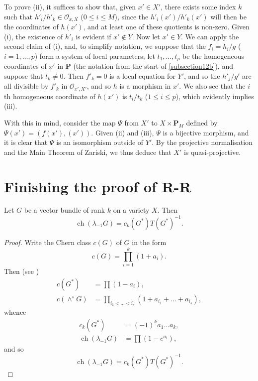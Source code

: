 \documentclass{article}
\theoremstyle{plain}
\newenvironment{lemma}[1]
    {\renewcommand\theinnercustomlemma{#1}\innercustomlemma}
    {\endinnercustomlemma}
\theoremstyle{definition}
\newcommand{\sh}[1]{{\mathscr{#1}}}
\newcommand{\PP}{\mathbf{P}}
\renewcommand{\leq}{\leqslant}
\DeclareMathOperator{\ch}{ch}
\newcommand{\oldpage}[1]{\marginpar{\footnotesize$\Big\vert$ \textit{p.~#1}}}
\begin{document}
To prove (ii), it suffices to show that, given $x'\in X'$, there exists some index $k$ such that $h'_i/h'_k\in\sh{O}_{x,X}$ ($0\leq i\leq M$), since the $h'_i(x')/h'_k(x')$ will then be the coordinates of $h(x')$, and at least one of these quotients is non-zero.
Given (i), the existence of $h'_i$ is evident if $x'\not\in Y$.
Now let $x'\in Y$.
We can apply the second claim of (i), and, to simplify notation,
\oldpage{128}
we suppose that the $f_i=h_i/g$ ($i=1,\ldots,p$) form a system of local parameters;
let $t_1,\ldots,t_p$ be the homogeneous coordinates of $x'$ in $\PP$ (the notation from the start of \cref{subsection12b}), and suppose that $t_k\neq0$.
Then $f'_k=0$ is a local equation for $Y'$, and so the $h'_j/g'$ are all divisible by $f'_k$ in $\sh{O}_{x',X'}$, and so $h$ is a morphism in $x'$.
We also see that the $i$th homogeneous coordinate of $h(x')$ is $t_i/t_k$ ($1\leq i\leq p$), which evidently implies (iii).

With this in mind, consider the map $\Psi$ from $X'$ to $X\times\PP_M$ defined by $\Psi(x')=(f(x'),(x'))$.
Given (ii) and (iii), $\Psi$ is a bijective morphism, and it is clear that $\Psi$ is an isomorphism outside of $Y'$.
By the projective normalisation and the Main Theorem of Zariski, we thus deduce that $X'$ is quasi-projective.


\section{Finishing the proof of R-R}
\label{section13}

\begin{lemma}{18}
\label{lemma18}
  Let $G$ be a vector bundle of rank $k$ on a variety $X$.
  Then
  \[
    \ch(\lambda_{-1}G) = c_k(G^*)T(G^*)^{-1}.
  \]
\end{lemma}

\begin{proof}
  Write the Chern class $c(G)$ of $G$ in the form
  \[
    c(G) = \prod_{i=1}^k (1+a_i).
  \]
  Then (see \cite{9})
  \begin{align*}
    c(G^*) &= \prod (1-a_i),
  \\c(\wedge^sG) &= \prod_{i_1<\ldots<i_s} (1+a_{i_1}+\ldots+a_{i_s}),
  \end{align*}
  whence
  \begin{align*}
    c_k(G^*) &= (-1)^k a_1\ldots a_k,
  \\\ch(\lambda_{-1}G) &= \prod (1-e^{a_i}),
  \end{align*}
  and so
  \[
    \ch(\lambda_{-1}G) = c_k(G^*)T(G^*)^{-1}.
  \]
\end{proof}
\end{document}
